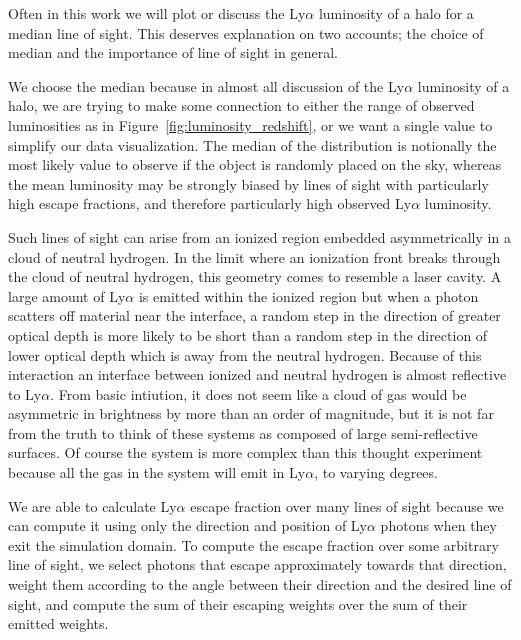 Often in this work we will plot or discuss the Ly$\alpha$ luminosity of a halo for a median line of sight.
This deserves explanation on two accounts; the choice of median and the importance of line of sight in general.

We choose the median because in almost all discussion of the Ly$\alpha$ luminosity of a halo, we are trying to make some connection to either the range of observed luminosities as in Figure~\ref{fig:luminosity_redshift}, or we want a single value to simplify our data visualization.
The median of the distribution is notionally the most likely value to observe if the object is randomly placed on the sky, whereas the mean luminosity may be strongly biased by lines of sight with particularly high escape fractions, and therefore particularly high observed Ly$\alpha$ luminosity.

Such lines of sight can arise from an ionized region embedded asymmetrically in a cloud of neutral hydrogen.
In the limit where an ionization front breaks through the cloud of neutral hydrogen, this geometry comes to resemble a laser cavity.
A large amount of Ly$\alpha$ is emitted within the ionized region but when a photon scatters off material near the interface, a random step in the direction of greater optical depth is more likely to be short than a random step in the direction of lower optical depth which is away from the neutral hydrogen.
Because of this interaction an interface between ionized and neutral hydrogen is almost reflective to Ly$\alpha$.
From basic intiution, it does not seem like a cloud of gas would be asymmetric in brightness by more than an order of magnitude, but it is not far from the truth to think of these systems as composed of large semi-reflective surfaces.
Of course the system is more complex than this thought experiment because all the gas in the system will emit in Ly$\alpha$, to varying degrees.

We are able to calculate Ly$\alpha$ escape fraction over many lines of sight because we can compute it using only the direction and position of Ly$\alpha$ photons when they exit the simulation domain.
To compute the escape fraction over some arbitrary line of sight, we select photons that escape approximately towards that direction, weight them according to the angle between their direction and the desired line of sight, and compute the sum of their escaping weights over the sum of their emitted weights.

